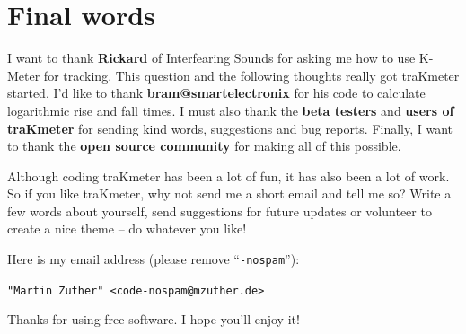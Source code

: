




\chapter{Final words}
\label{chap:final_words}

I want to thank \textbf{Rickard} of Interfearing Sounds for asking me
how to use K-Meter for tracking.  This question and the following
thoughts really got traKmeter started.  I'd like to thank
\textbf{bram@smartelectronix} for his code to calculate logarithmic
rise and fall times.  I must also thank the \textbf{beta testers} and
\textbf{users of traKmeter} for sending kind words, suggestions and
bug reports.  Finally, I want to thank the \textbf{open source
  community} for making all of this possible.

Although coding traKmeter has been a lot of fun, it has also been a
lot of work.  So if you like traKmeter, why not send me a short email
and tell me so?  Write a few words about yourself, send suggestions
for future updates or volunteer to create a nice theme -- do whatever
you like!

Here is my email address (please remove ``\texttt{-nospam}''):

\begin{center}
  \texttt{"Martin Zuther" <code-nospam@mzuther.de>}
\end{center}

Thanks for using free software.  I hope you'll enjoy it!

